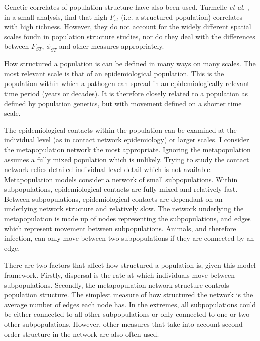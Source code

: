 Genetic correlates of population structure have also been used.
Turmelle \emph{et al.} \cite{turmelle2009correlates}, in a small analysis, find that high $F_{st}$ (i.e. a structured population) correlates with high richness.
However, they do not account for the widely different spatial scales foudn in population structure studies, nor do they deal with the differences between $F_{ST}$, $\phi_{ST}$ and other measures appropriately. 




How structured a population is can be defined in many ways on many scales.
The most relevant scale is that of an epidemiological population.
This is the population within which a pathogen can spread in an epidemiologically relevant time period (years or decades).
It is therefore closely related to a population as defined by population genetics, but with movement defined on a shorter time scale.

The epidemiological contacts within the population can be examined at the individual level (as in contact network epidemiology) or larger scales.
I consider the metapopulation network the most appropriate.
Ignoring the metapopulation assumes a fully mixed population which is unlikely.
Trying to study the contact network relies detailed individual level detail which is not available.
Metapopulation models consider a network of small subpopulations. 
Within subpopulations, epidemiological contacts are fully mixed and relatively fast.
Between subpopulations, epidemiological contacts are dependant on an underlying network structure and relatively slow.
The network underlying the metapopulation is made up of nodes representing the subpopulations, and edges which represent movement between subpopulations.
Animals, and therefore infection, can only move between two subpopulations if they are connected by an edge.

There are two factors that affect how structured a population is, given this model framework.
Firstly, dispersal is the rate at which individuals move between subpopulations.
Secondly, the metapopulation network structure controls population structure.
The simplest measure of how structured the network is the average number of edges each node has.
In the extremes, all subpopulations could be either connected to all other subpopulations or only connected to one or two other subpopulations.
However, other measures that take into account second-order structure in the network are also often used.




